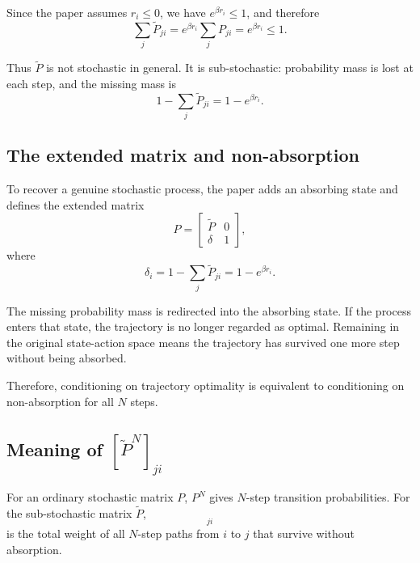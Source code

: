 \documentclass[11pt]{article}
\begin{document}
Since the paper assumes \(r_i\le 0\), we have \(e^{\beta r_i}\le 1\), and therefore
\begin{equation}
    \sum_j \widetilde{P}_{ji}
    = e^{\beta r_i}\sum_j P_{ji}
    = e^{\beta r_i}\le 1.
\end{equation}

Thus \(\widetilde{P}\) is not stochastic in general. It is sub-stochastic: probability mass is
lost at each step, and the missing mass is
\begin{equation}
    1-\sum_j \widetilde{P}_{ji} = 1-e^{\beta r_i}.
\end{equation}

\subsection*{The extended matrix and non-absorption}

To recover a genuine stochastic process, the paper adds an absorbing state and defines the
extended matrix
\begin{equation}
    P =
    \begin{bmatrix}
        \widetilde{P} & 0 \\
        \delta & 1
    \end{bmatrix},
\end{equation}
where
\begin{equation}
    \delta_i = 1-\sum_j \widetilde{P}_{ji} = 1-e^{\beta r_i}.
\end{equation}

The missing probability mass is redirected into the absorbing state. If the process enters
that state, the trajectory is no longer regarded as optimal. Remaining in the original
state-action space means the trajectory has survived one more step without being absorbed.

Therefore, conditioning on trajectory optimality is equivalent to conditioning on
non-absorption for all \(N\) steps.

\subsection*{Meaning of \texorpdfstring{$[\widetilde{P}^{N}]_{ji}$}{[P-tilde\string^N]\_ji}}

For an ordinary stochastic matrix \(P\), \(P^N\) gives \(N\)-step transition probabilities.
For the sub-stochastic matrix \(\widetilde{P}\),
\begin{equation}
    [\widetilde{P}^{N}]_{ji}
\end{equation}
is the total weight of all \(N\)-step paths from \(i\) to \(j\) that survive without
absorption.
\end{document}
